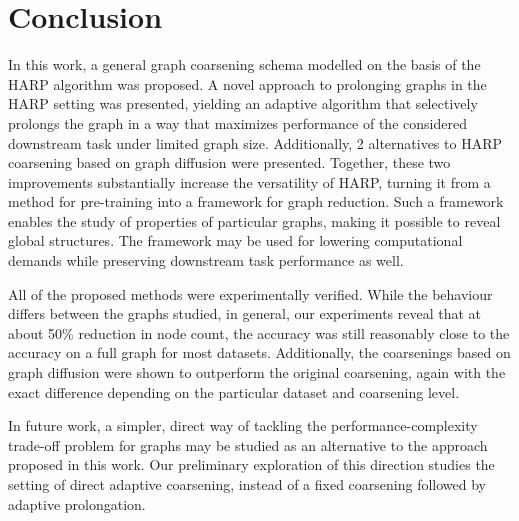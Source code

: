 \section{Conclusion}

In this work, a general graph coarsening schema modelled on the basis of the HARP algorithm was proposed. A novel approach to prolonging graphs in the HARP setting was presented, yielding an adaptive algorithm that selectively prolongs the graph in a way that maximizes performance of the considered downstream task under limited graph size. Additionally, 2 alternatives to HARP coarsening based on graph diffusion were presented. Together, these two improvements substantially increase the versatility of HARP, turning it from a method for pre-training into a framework for graph reduction. Such a framework enables the study of properties of particular graphs, making it possible to reveal global structures. The framework may be used for lowering computational demands while preserving downstream task performance as well.

All of the proposed methods were experimentally verified. While the behaviour differs between the graphs studied, in general, our experiments reveal that at about 50\% reduction in node count, the accuracy was still reasonably close to the accuracy on a full graph for most datasets. Additionally, the coarsenings based on graph diffusion were shown to outperform the original coarsening, again with the exact difference depending on the particular dataset and coarsening level.

In future work, a simpler, direct way of tackling the performance-complexity trade-off problem for graphs may be studied as an alternative to the approach proposed in this work. Our preliminary exploration of this direction \cite{prochazka_downstream_2022} studies the setting of direct adaptive coarsening, instead of a fixed coarsening followed by adaptive prolongation.
